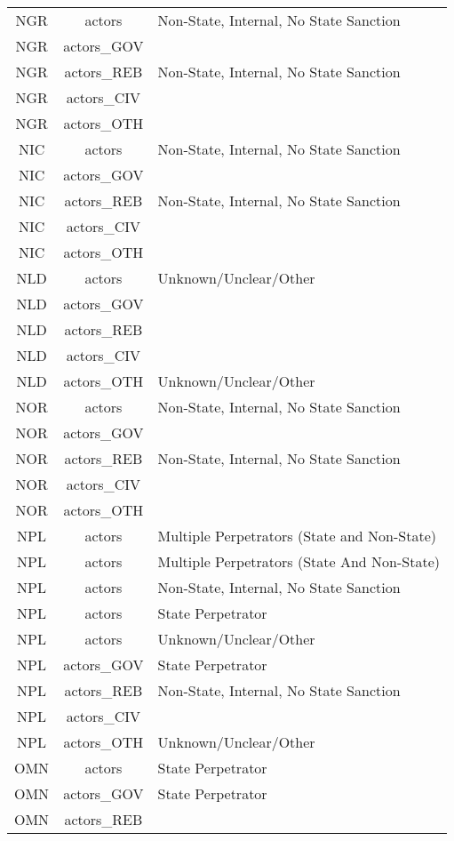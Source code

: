 \documentclass[12pt]{article}
\begin{document}
\begin{center}
\begin{longtable}{|c|c|p{10cm}|}
  NGR & actors & Non-State, Internal, No State Sanction \\ 
  NGR & actors\_GOV &  \\ 
  NGR & actors\_REB & Non-State, Internal, No State Sanction \\ 
  NGR & actors\_CIV &  \\ 
  NGR & actors\_OTH &  \\ 
  NIC & actors & Non-State, Internal, No State Sanction \\ 
  NIC & actors\_GOV &  \\ 
  NIC & actors\_REB & Non-State, Internal, No State Sanction \\ 
  NIC & actors\_CIV &  \\ 
  NIC & actors\_OTH &  \\ 
  NLD & actors & Unknown/Unclear/Other \\ 
  NLD & actors\_GOV &  \\ 
  NLD & actors\_REB &  \\ 
  NLD & actors\_CIV &  \\ 
  NLD & actors\_OTH & Unknown/Unclear/Other \\ 
  NOR & actors & Non-State, Internal, No State Sanction \\ 
  NOR & actors\_GOV &  \\ 
  NOR & actors\_REB & Non-State, Internal, No State Sanction \\ 
  NOR & actors\_CIV &  \\ 
  NOR & actors\_OTH &  \\ 
  NPL & actors & Multiple Perpetrators (State and Non-State) \\ 
  NPL & actors & Multiple Perpetrators (State And Non-State) \\ 
  NPL & actors & Non-State, Internal, No State Sanction \\ 
  NPL & actors & State Perpetrator \\ 
  NPL & actors & Unknown/Unclear/Other \\ 
  NPL & actors\_GOV & State Perpetrator \\ 
  NPL & actors\_REB & Non-State, Internal, No State Sanction \\ 
  NPL & actors\_CIV &  \\ 
  NPL & actors\_OTH & Unknown/Unclear/Other \\ 
  OMN & actors & State Perpetrator \\ 
  OMN & actors\_GOV & State Perpetrator \\ 
  OMN & actors\_REB &  \\ 

\end{longtable}
\end{center}
\end{document}
